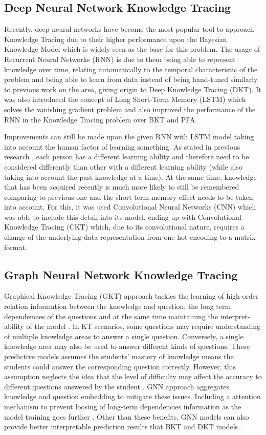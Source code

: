 \documentclass{article}
\begin{document}
\subsection{Deep Neural Network Knowledge Tracing}
Recently, deep neural networks have become the most popular tool to approach Knowledge Tracing \cite{Xiong2016} due to their higher performance upon the Bayesian Knowledge Model which is widely seen as the base for this problem. The usage of Recurrent Neural Networks (RNN) is due to them being able to represent knowledge over time, relating automatically to the temporal characteristic of the problem and being able to learn from data instead of being hand-tuned similarly to previous work on the area, giving origin to Deep Knowledge Tracing (DKT). It was also introduced the concept of Long Short-Term Memory (LSTM) which solves the vanishing gradient problem and also improved the performance of the RNN in the Knowledge Tracing problem over BKT and PFA. 

Improvements can still be made upon the given RNN with LSTM model taking into account the human factor of learning something. As stated in previous research \cite{Minn2018}, each person has a different learning ability and therefore need to be considered differently than other with a different learning ability (while also taking into account the past knowledge at a time). At the same time, knowledge that has been acquired recently is much more likely to still be remembered comparing to previous one \cite{Yang2020} and the short-term memory effect needs to be taken into account. For this, it was used Convolutional Neural Networks (CNN) which was able to include this detail into its model, ending up with Convolutional Knowledge Tracing (CKT) which, due to its convolutional nature, requires a change of the underlying data representation from one-hot encoding to a matrix format.

\subsection{Graph Neural Network Knowledge Tracing}
Graphical Knowledge Tracing (GKT) approach tackles the learning of high-order relation information between the knowledge and question\cite{Yang2020, Tong2020}, the long term dependencies of the questions \cite{Yang2020} and at the same time maintaining the interpret-ability of the model \cite{Nakagawa2019}. In KT scenarios, some questions may require understanding of multiple knowledge areas to answer a single question. Conversely, a single knowledge area may also be used to answer different kinds of questions. These predictive models assumes the students' mastery of knowledge means the students could answer the corresponding question correctly. However, this assumption neglects the idea that the level of difficulty may affect the accuracy to different questions answered by the student \cite{Yang2020}. GNN approach aggregates knowledge and question embedding to mitigate these issues. Including a attention mechanism to prevent loosing of long-term dependencies information as the model training goes further \cite{Yang2020}. Other than these benefits, GNN models can also provide better interpretable prediction results that BKT and DKT models \cite{Nakagawa2019}.
\end{document}

